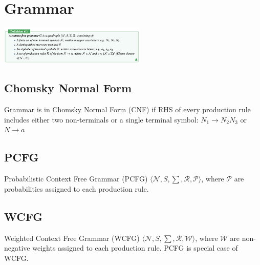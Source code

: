 \section{Grammar}
\includegraphics[width=7cm]{cfg_def.png}
\subsection{Chomsky Normal Form}
Grammar is in Chomsky Normal Form (CNF) if RHS of every production rule includes either two non-terminals or a single terminal symbol:
$N_1 \rightarrow N_2 N_3$ or $N \rightarrow a$\\
\subsection{PCFG}
Probabilistic Context Free Grammar (PCFG) $\langle \mathcal{N}, S, \sum, \mathcal{R}, \mathcal{P} \rangle$, where $\mathcal{P}$ are probabilities assigned to each production rule.\\
\subsection{WCFG}
Weighted Context Free Grammar (WCFG) $\langle \mathcal{N}, S, \sum, \mathcal{R}, \mathcal{W} \rangle$, where $\mathcal{W}$ are non-negative weights assigned to each production rule. PCFG is special case of WCFG.
